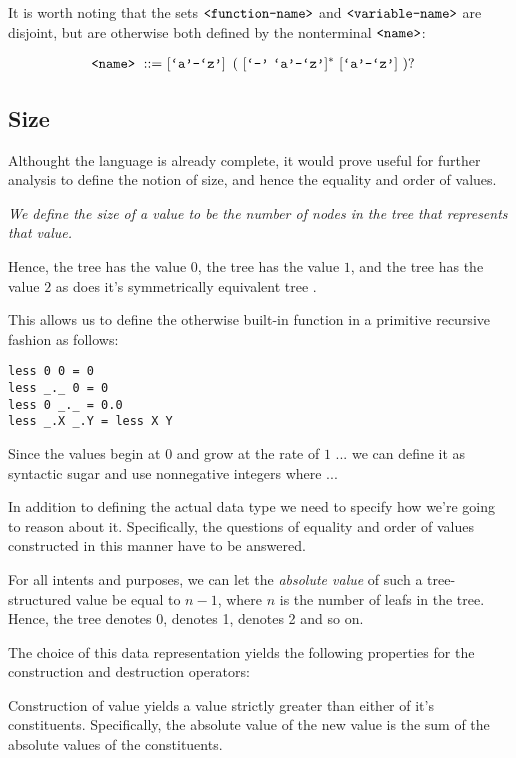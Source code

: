 It is worth noting that the sets $\text{{\ttfamily<function-name>}}$ and
$\text{{\ttfamily<variable-name>}}$ are disjoint, but are otherwise both defined by the
nonterminal $\text{{\ttfamily<name>}}$:

\begin{align}
\text{{\ttfamily<name>}}\ ::=&\ [\text{{\ttfamily`a'}}\text{{\ttfamily-}}\text{{\ttfamily`z'}}]
\ \left (\ [\text{{\ttfamily`-'}}\ \text{{\ttfamily`a'}}\text{{\ttfamily-}}\text{{\ttfamily`z'}}]^*
\ [\text{{\ttfamily`a'}}\text{{\ttfamily-}}\text{{\ttfamily`z'}}]\ \right )?
\end{align}

\subsection{Size}

Althought the language is already complete, it would prove useful for further
analysis to define the notion of size, and hence the equality and order of
values.

\emph{We define the size of a value to be the number of nodes in the tree that
represents that value.}

Hence, the tree  has the value $0$, the tree  has the value
$1$, and the tree  has the value $2$ as does it's symmetrically
equivalent tree .

This allows us to define the otherwise built-in function  in a
primitive recursive fashion as follows:

\begin{verbatim}
less 0 0 = 0
less _._ 0 = 0
less 0 _._ = 0.0
less _.X _.Y = less X Y
\end{verbatim}

Since the values begin at $0$ and grow at the rate of $1$ ... we can define it
as syntactic sugar and use nonnegative integers where ...

In addition to defining the actual data type we need to specify how we're going
to reason about it. Specifically, the questions of equality and order of values
constructed in this manner have to be answered.

For all intents and purposes, we can let the \emph{absolute value} of such a
tree-structured value be equal to $n-1$, where $n$ is the number of leafs in
the tree. Hence, the tree  denotes $0$,  denotes 1,
 denotes 2 and so on.

The choice of this data representation yields the following properties for the
construction and destruction operators:

\begin{lemma} Construction of value yields a value strictly greater than either
of it's constituents. Specifically, the absolute value of the new value is the
sum of the absolute values of the constituents.\end{lemma}

